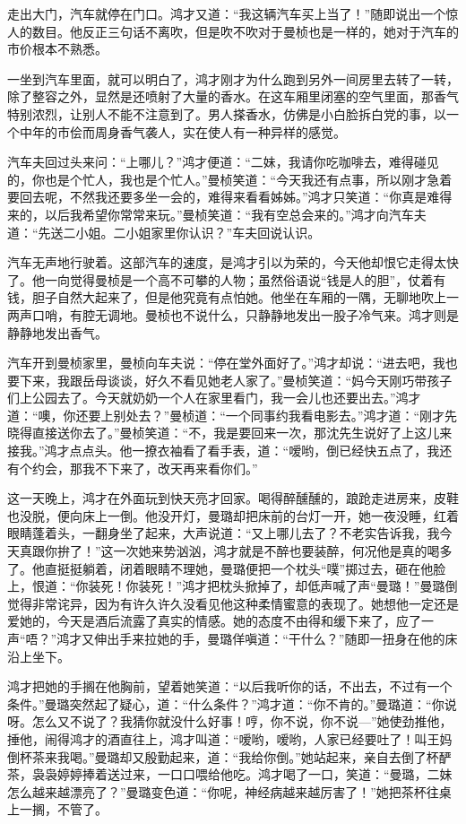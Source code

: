 \par 走出大门，汽车就停在门口。鸿才又道：“我这辆汽车买上当了！”随即说出一个惊人的数目。他反正三句话不离吹，但是吹不吹对于曼桢也是一样的，她对于汽车的市价根本不熟悉。
\par 一坐到汽车里面，就可以明白了，鸿才刚才为什么跑到另外一间房里去转了一转，除了整容之外，显然是还喷射了大量的香水。在这车厢里闭塞的空气里面，那香气特别浓烈，让别人不能不注意到了。男人搽香水，仿佛是小白脸拆白党的事，以一个中年的市侩而周身香气袭人，实在使人有一种异样的感觉。
\par 汽车夫回过头来问：“上哪儿？”鸿才便道：“二妹，我请你吃咖啡去，难得碰见的，你也是个忙人，我也是个忙人。”曼桢笑道：“今天我还有点事，所以刚才急着要回去呢，不然我还要多坐一会的，难得来看看姊姊。”鸿才只笑道：“你真是难得来的，以后我希望你常常来玩。”曼桢笑道：“我有空总会来的。”鸿才向汽车夫道：“先送二小姐。二小姐家里你认识？”车夫回说认识。
\par 汽车无声地行驶着。这部汽车的速度，是鸿才引以为荣的，今天他却恨它走得太快了。他一向觉得曼桢是一个高不可攀的人物；虽然俗语说“钱是人的胆”，仗着有钱，胆子自然大起来了，但是他究竟有点怕她。他坐在车厢的一隅，无聊地吹上一两声口哨，有腔无调地。曼桢也不说什么，只静静地发出一股子冷气来。鸿才则是静静地发出香气。
\par 汽车开到曼桢家里，曼桢向车夫说：“停在堂外面好了。”鸿才却说：“进去吧，我也要下来，我跟岳母谈谈，好久不看见她老人家了。”曼桢笑道：“妈今天刚巧带孩子们上公园去了。今天就奶奶一个人在家里看门，我一会儿也还要出去。”鸿才道：“噢，你还要上别处去？”曼桢道：“一个同事约我看电影去。”鸿才道：“刚才先晓得直接送你去了。”曼桢笑道：“不，我是要回来一次，那沈先生说好了上这儿来接我。”鸿才点点头。他一撩衣袖看了看手表，道：“嗳哟，倒已经快五点了，我还有个约会，那我不下来了，改天再来看你们。”
\par 这一天晚上，鸿才在外面玩到快天亮才回家。喝得醉醺醺的，踉跄走进房来，皮鞋也没脱，便向床上一倒。他没开灯，曼璐却把床前的台灯一开，她一夜没睡，红着眼睛蓬着头，一翻身坐了起来，大声说道：“又上哪儿去了？不老实告诉我，我今天真跟你拚了！”这一次她来势汹汹，鸿才就是不醉也要装醉，何况他是真的喝多了。他直挺挺躺着，闭着眼睛不理她，曼璐便把一个枕头“噗”掷过去，砸在他脸上，恨道：“你装死！你装死！”鸿才把枕头掀掉了，却低声喊了声“曼璐！”曼璐倒觉得非常诧异，因为有许久许久没看见他这种柔情蜜意的表现了。她想他一定还是爱她的，今天是酒后流露了真实的情感。她的态度不由得和缓下来了，应了一声“唔？”鸿才又伸出手来拉她的手，曼璐佯嗔道：“干什么？”随即一扭身在他的床沿上坐下。
\par 鸿才把她的手搁在他胸前，望着她笑道：“以后我听你的话，不出去，不过有一个条件。”曼璐突然起了疑心，道：“什么条件？”鸿才道：“你不肯的。”曼璐道：“你说呀。怎么又不说了？我猜你就没什么好事！哼，你不说，你不说—”她使劲推他，捶他，闹得鸿才的酒直往上，鸿才叫道：“嗳哟，嗳哟，人家已经要吐了！叫王妈倒杯茶来我喝。”曼璐却又殷勤起来，道：“我给你倒。”她站起来，亲自去倒了杯酽茶，袅袅婷婷捧着送过来，一口口喂给他吃。鸿才喝了一口，笑道：“曼璐，二妹怎么越来越漂亮了？”曼璐变色道：“你呢，神经病越来越厉害了！”她把茶杯往桌上一搁，不管了。
